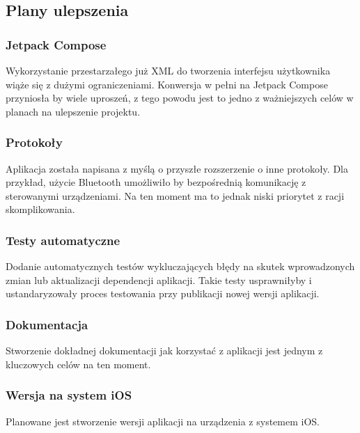 \newpage

\subsection{Plany ulepszenia}

\subsubsection{Jetpack Compose}
Wykorzystanie przestarzałego już XML do tworzenia interfejsu użytkownika wiąże się z dużymi ograniczeniami. Konwersja w pełni na Jetpack Compose przyniosła by wiele uproszeń, z tego powodu jest to jedno z ważniejszych celów w planach na ulepszenie projektu.

\subsubsection{Protokoły}
Aplikacja została napisana z myślą o przyszłe rozszerzenie o inne protokoły. Dla przykład, użycie Bluetooth umożliwiło by bezpośrednią komunikację z sterowanymi urządzeniami. Na ten moment ma to jednak niski priorytet z racji skomplikowania.

\subsubsection{Testy automatyczne}
Dodanie automatycznych testów wykluczających błędy na skutek wprowadzonych zmian lub aktualizacji dependencji aplikacji. Takie testy usprawniłyby i ustandaryzowały proces testowania przy publikacji nowej wersji aplikacji.

\subsubsection{Dokumentacja}
Stworzenie dokładnej dokumentacji jak korzystać z aplikacji jest jednym z kluczowych celów na ten moment.

\subsubsection{Wersja na system iOS}
Planowane jest stworzenie wersji aplikacji na urządzenia z systemem iOS.